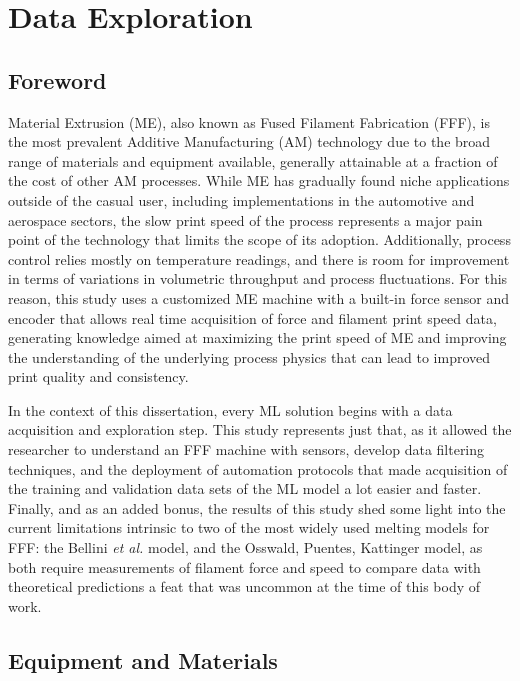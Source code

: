 \documentclass[main.tex]{subfiles}
\begin{document}
\chapter{Data Exploration} \label{ch:data_ex}
\section{Foreword} \label{sec:fw_dataex}

Material Extrusion (ME), also known as Fused Filament Fabrication (FFF), is the most prevalent Additive Manufacturing (AM) technology due to the broad range of materials and equipment available, generally attainable at a fraction of the cost of other AM processes. While ME has gradually found niche applications outside of the casual user, including implementations in the automotive and aerospace sectors, the slow print speed of the process represents a major pain point of the technology that limits the scope of its adoption. Additionally, process control relies mostly on temperature readings, and there is room for improvement in terms of variations in volumetric throughput and process fluctuations. For this reason, this study uses a customized ME machine with a built-in force sensor and encoder that allows real time acquisition of force and filament print speed data, generating knowledge aimed at maximizing the print speed of ME and improving the understanding of the underlying process physics that can lead to improved print quality and consistency. 

In the context of this dissertation, every ML solution begins with a data acquisition and exploration step. This study represents just that, as it allowed the researcher to understand an FFF machine with sensors, develop data filtering techniques, and the deployment of automation protocols that made acquisition of the training and validation data sets of the ML model a lot easier and faster. Finally, and as an added bonus, the results of this study shed some light into the current limitations intrinsic to two of the most widely used melting models for FFF: the Bellini \emph{et al.} model, and the Osswald, Puentes, Kattinger model, as both require measurements of filament force and speed to compare data with theoretical predictions \textemdash a feat that was uncommon at the time of this body of work.

\section{Equipment and Materials} \label{ssec:mat_data}
\end{document}

